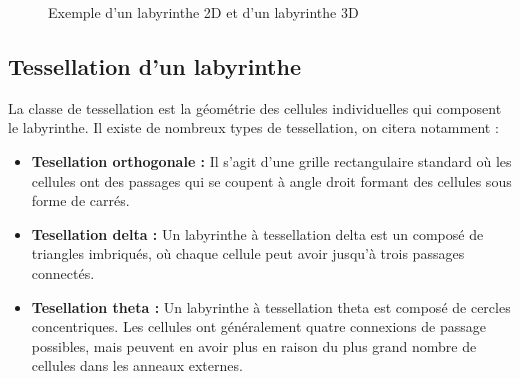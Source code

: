 \begin{figure}[htp] 
    \centering
    \hfill%
    \caption{Exemple d'un labyrinthe 2D et d'un labyrinthe 3D}
\end{figure}


\subsection{Tessellation d'un labyrinthe}
La classe de tessellation est la géométrie des cellules individuelles qui composent le labyrinthe. Il existe de nombreux types de tessellation, on citera notamment :
\begin{itemize}
\item\textbf{ Tesellation orthogonale :} Il s'agit d'une grille rectangulaire standard où les cellules ont des passages qui se coupent à angle droit formant des cellules sous forme de carrés.

\item\textbf{Tesellation delta :} Un labyrinthe à tessellation delta est un composé de triangles imbriqués, où chaque cellule peut avoir jusqu'à trois passages connectés.

\item\textbf{Tesellation theta :} Un labyrinthe à tessellation theta est composé de cercles concentriques. Les cellules ont généralement quatre connexions de passage possibles, mais peuvent en avoir plus en raison du plus grand nombre de cellules dans les anneaux externes.
\end{itemize}

